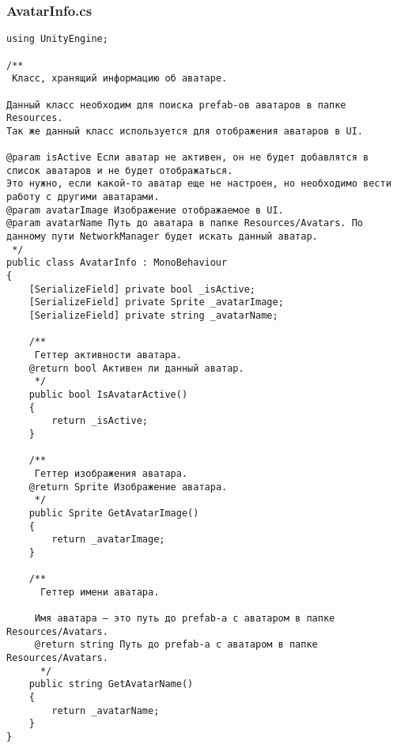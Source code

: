 \subsubsection*{AvatarInfo.cs}
\begin{verbatim}
﻿using UnityEngine;

/**
 Класс, хранящий информацию об аватаре.

Данный класс необходим для поиска prefab-ов аватаров в папке Resources.
Так же данный класс используется для отображения аватаров в UI.

@param isActive Если аватар не активен, он не будет добавлятся в список аватаров и не будет отображаться.
Это нужно, если какой-то аватар еще не настроен, но необходимо вести работу с другими аватарами.
@param avatarImage Изображение отображаемое в UI.
@param avatarName Путь до аватара в папке Resources/Avatars. По данному пути NetworkManager будет искать данный аватар.
 */
public class AvatarInfo : MonoBehaviour
{
    [SerializeField] private bool _isActive;
    [SerializeField] private Sprite _avatarImage;
    [SerializeField] private string _avatarName;

    /**
     Геттер активности аватара.
    @return bool Активен ли данный аватар.
     */
    public bool IsAvatarActive()
    {
        return _isActive;
    }

    /**
     Геттер изображения аватара.
    @return Sprite Изображение аватара.
     */
    public Sprite GetAvatarImage()
    {
        return _avatarImage;
    }

    /**
      Геттер имени аватара.

     Имя аватара — это путь до prefab-а с аватаром в папке Resources/Avatars.
     @return string Путь до prefab-а с аватаром в папке Resources/Avatars.
      */
    public string GetAvatarName()
    {
        return _avatarName;
    }
}

\end{verbatim}
